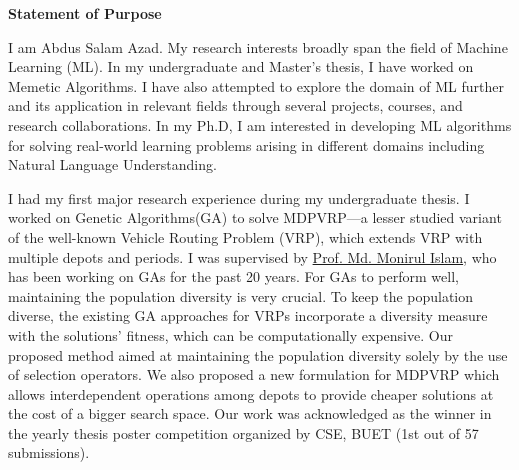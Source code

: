 \documentclass[12pt]{article}
\begin{document}


\fancyhf{}
\rfoot{\thepage}

\begin{center}
{\LARGE \bf 
Statement of Purpose}\\
\end{center}




I am Abdus Salam Azad. My research interests broadly span the field of Machine Learning (ML). In my undergraduate and Master's thesis, I have worked on Memetic Algorithms. I have also attempted to explore the domain of ML further and its application in relevant fields through several projects, courses, and research collaborations. In my Ph.D, I am interested in developing ML algorithms for solving real-world learning problems arising in different domains including Natural Language Understanding. 

I had my first major research experience during my undergraduate thesis. I worked on Genetic Algorithms(GA) to solve MDPVRP---a lesser studied variant of the well-known Vehicle Routing Problem (VRP), which extends VRP with multiple depots and periods. I was supervised by \href{http://cse.buet.ac.bd/faculty/facdetail.php?id=mdmonirulislam}{Prof. Md. Monirul Islam}, who has been working on GAs for the past 20 years. For GAs to perform well, maintaining the population diversity is very crucial. To keep the population diverse, the existing GA approaches for VRPs incorporate a diversity measure with the solutions' fitness, which can be computationally expensive. Our proposed method aimed at maintaining the population diversity solely by the use of selection operators. We also proposed a new formulation for MDPVRP which allows interdependent operations among depots to provide cheaper solutions at the cost of a bigger search space. Our work was acknowledged as the winner in the yearly thesis poster competition organized by CSE, BUET (1st out of 57 submissions).
\end{document}
